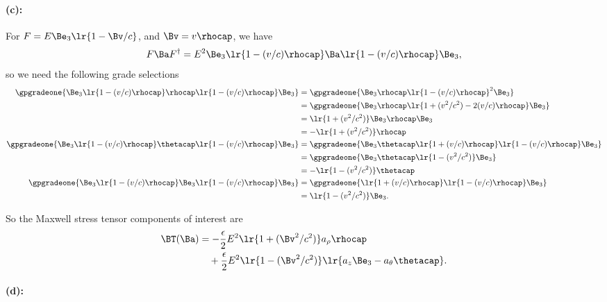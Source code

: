 \paragraph{(c):}

For \( F = E \Be_3 \lr{ 1 - \Bv/c } \), and \( \Bv = v \rhocap \), we have
\begin{equation}\label{eqn:poyntingStaticExamples:1220}
F \Ba F^\dagger
=
E^2 \Be_3 \lr{ 1 - (v/c) \rhocap } \Ba \lr{ 1 - (v/c) \rhocap } \Be_3,
\end{equation}
so we need the following grade selections
\begin{equation}\label{eqn:poyntingStaticExamples:1260}
\begin{aligned}
\gpgradeone{ \Be_3 \lr{ 1 - (v/c) \rhocap } \rhocap \lr{ 1 - (v/c) \rhocap } \Be_3 }
&=
\gpgradeone{ \Be_3 \rhocap \lr{ 1 - (v/c) \rhocap }^2 \Be_3 } \\
&=
\gpgradeone{ \Be_3 \rhocap \lr{ 1 + (v^2/c^2) - 2 (v/c) \rhocap } \Be_3 } \\
&=
\lr{ 1 + (v^2/c^2) } \Be_3 \rhocap \Be_3 \\
&=
-\lr{ 1 + (v^2/c^2) } \rhocap \\
\gpgradeone{ \Be_3 \lr{ 1 - (v/c) \rhocap } \thetacap \lr{ 1 - (v/c) \rhocap } \Be_3 }
&=
\gpgradeone{ \Be_3 \thetacap \lr{ 1 + (v/c) \rhocap } \lr{ 1 - (v/c) \rhocap } \Be_3 } \\
&=
\gpgradeone{ \Be_3 \thetacap \lr{ 1 - (v^2/c^2) } \Be_3 } \\
&=
-\lr{ 1 - (v^2/c^2) } \thetacap \\
\gpgradeone{ \Be_3 \lr{ 1 - (v/c) \rhocap } \Be_3 \lr{ 1 - (v/c) \rhocap } \Be_3 }
&=
\gpgradeone{ \lr{ 1 + (v/c) \rhocap } \lr{ 1 - (v/c) \rhocap } \Be_3 } \\
&=
\lr{ 1 - (v^2/c^2) } \Be_3.
\end{aligned}
\end{equation}

So the Maxwell stress tensor components of interest are
\begin{equation}\label{eqn:poyntingStaticExamples:1320}
\begin{aligned}
\BT(\Ba)
&=
-\frac{\epsilon}{2} E^2 \lr{ 1 + (\Bv^2/c^2) } a_\rho \rhocap \\
&\quad +
\frac{\epsilon}{2} E^2 \lr{ 1 - (\Bv^2/c^2) } \lr{ a_z \Be_3 - a_\theta \thetacap }.
\end{aligned}
\end{equation}

\paragraph{(d):}

